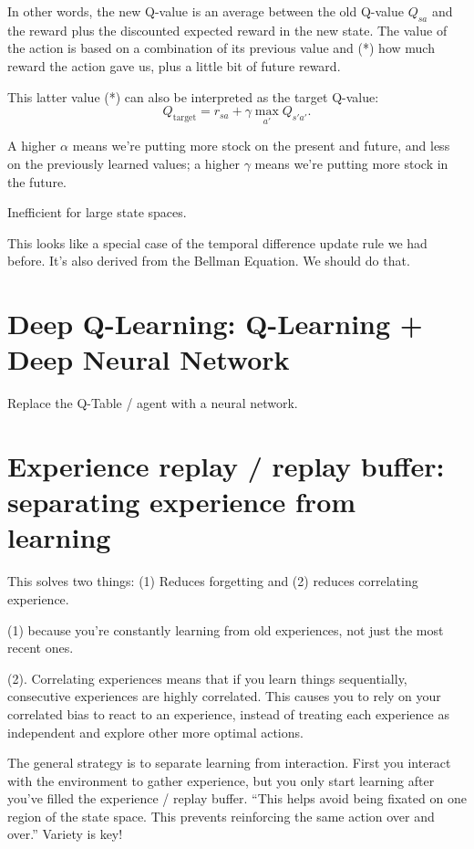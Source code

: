 \documentclass[17pt]{extarticle}
\theoremstyle{plain}
\theoremstyle{definition}
\theoremstyle{remark}
\newcommand{\0}{\varnothing}
\newcommand{\<}{\langle}
\renewcommand{\>}{\rangle}
\begin{document}
In other words, the new Q-value is an average between the old Q-value \( Q_{sa}
\) and the reward plus the discounted expected reward in the new state. The
value of the action is based on a combination of its previous value and (*) how much
reward the action gave us, plus a little bit of future reward.

This latter value (*) can also be interpreted as the target Q-value:
$$
Q_{\text{target}} = r_{sa} + \gamma \max_{a'} Q_{s'a'}.
$$

A higher \(\alpha \) means we're
putting more stock on the present and future, and less on the previously learned
values; a higher \( \gamma \) means we're putting more stock in the future.

Inefficient for large state spaces.

This looks like a special case of the temporal difference update rule we had
before. It's also derived from the Bellman Equation. We should do that.

\section{Deep Q-Learning: Q-Learning + Deep Neural Network}

Replace the Q-Table / agent with a neural network.

\section{Experience replay / replay buffer: separating experience from learning}

This solves two things: (1) Reduces forgetting and (2) reduces correlating experience.

(1) because you're constantly learning from old experiences, not just the most recent ones.

(2). Correlating experiences means that if you learn things sequentially,
consecutive experiences are highly correlated. This causes you to rely on your
correlated bias to react to an experience, instead of treating each experience
as independent and explore other more optimal actions.

The general strategy is to separate learning from interaction. First you interact with the environment to gather experience, but you only start learning after you've filled the experience / replay buffer. ``This helps avoid being fixated on one region of the state space. This prevents reinforcing the same action over and over.'' Variety is key!
\end{document}
